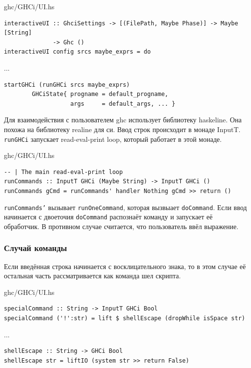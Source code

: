 \documentclass[fontsize=14pt, paper=a4, pagesize, DIV=calc]{scrartcl}
\def\code#1{\texttt{#1}}
\begin{document}
\begin{ListingEnv}
\caption{ghc/GHCi/UI.hs}
\begin{lstlisting}[firstnumber=400]
interactiveUI :: GhciSettings -> [(FilePath, Maybe Phase)] -> Maybe [String]
              -> Ghc ()
interactiveUI config srcs maybe_exprs = do
\end{lstlisting}
...
\begin{lstlisting}[firstnumber=454]
    startGHCi (runGHCi srcs maybe_exprs)
        GHCiState{ progname = default_progname,
                   args     = default_args, ... }
\end{lstlisting}
\end{ListingEnv}

Для взаимодействия с пользователем ghc использует библиотеку haskeline. Она
похожа на библиотеку realine для си. Ввод строк происходит в монаде InputT.
\code{runGHCi} запускает read-eval-print loop, который работает в этой монаде.

\begin{ListingEnv}
\caption{ghc/GHCi/UI.hs}
\begin{lstlisting}[firstnumber=892]
-- | The main read-eval-print loop
runCommands :: InputT GHCi (Maybe String) -> InputT GHCi ()
runCommands gCmd = runCommands' handler Nothing gCmd >> return ()
\end{lstlisting}
\end{ListingEnv}

\code{runCommands'} вызывает \code{runOneCommand}, которая вызвыает
\code{doCommand}. Если ввод начинается с двоеточия \code{doCommand} распознаёт
команду и запускает её обработчик. В противном случае считается, что
пользователь ввёл выражение.

\subsubsection{Случай команды}

Если введённая строка начинается с восклицательного знака, то в этом случае её
остальная часть рассматривается как команда шел скрипта.

\begin{ListingEnv}
\caption{ghc/GHCi/UI.hs}
\begin{lstlisting}[firstnumber=1204]
specialCommand :: String -> InputT GHCi Bool
specialCommand ('!':str) = lift $ shellEscape (dropWhile isSpace str)
\end{lstlisting}
...
\begin{lstlisting}[firstnumber=1221]
shellEscape :: String -> GHCi Bool
shellEscape str = liftIO (system str >> return False)
\end{lstlisting}
\end{ListingEnv}
\end{document}
